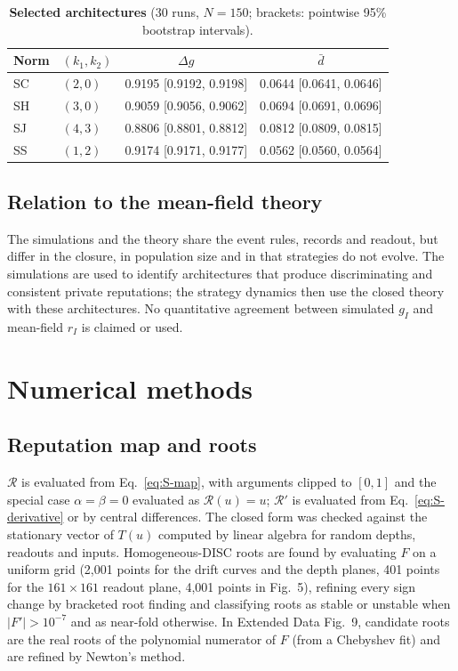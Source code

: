 \documentclass[fleqn,10pt]{article}
\theoremstyle{plain}
\theoremstyle{remark}
\newcommand{\FigOpportunism}{5}
\newcommand{\EDSecurity}{9}
\newcommand{\Rm}{\mathcal R}
\begin{document}
\begin{table}[htbp]
\centering\small
\caption{\textbf{Selected architectures} (30 runs, $N=150$; brackets: pointwise 95\% bootstrap intervals).}
\label{tab:selected}
\begin{tabular}{@{}llcc@{}}
\toprule
Norm & $(k_1,k_2)$ & $\Delta g$ & $\bar d$\\
\midrule
SC & $(2,0)$ & 0.9195 [0.9192, 0.9198] & 0.0644 [0.0641, 0.0646]\\
SH & $(3,0)$ & 0.9059 [0.9056, 0.9062] & 0.0694 [0.0691, 0.0696]\\
SJ & $(4,3)$ & 0.8806 [0.8801, 0.8812] & 0.0812 [0.0809, 0.0815]\\
SS & $(1,2)$ & 0.9174 [0.9171, 0.9177] & 0.0562 [0.0560, 0.0564]\\
\bottomrule
\end{tabular}
\end{table}

\subsection{Relation to the mean-field theory}
The simulations and the theory share the event rules, records and readout,
but differ in the closure, in population size and in that strategies do not
evolve. The simulations are used to identify architectures that produce
discriminating and consistent private reputations; the strategy dynamics
then use the closed theory with these architectures. No quantitative agreement
between simulated $g_I$ and mean-field $r_I$ is claimed or used.

\section{Numerical methods}
\label{sec:numerics}

\subsection{Reputation map and roots}
$\Rm$ is evaluated from Eq.~\eqref{eq:S-map}, with arguments clipped to $[0,1]$
and the special case $\alpha=\beta=0$ evaluated as $\Rm(u)=u$; $\Rm'$ is evaluated
from Eq.~\eqref{eq:S-derivative} or by central differences. The closed form was
checked against the stationary vector of $T(u)$ computed by linear algebra for
random depths, readouts and inputs. Homogeneous-DISC roots are found by
evaluating $F$ on a uniform grid (2,001 points for the drift curves and the
depth planes, 401 points for the $161\times161$ readout plane, 4,001 points in
Fig.~\FigOpportunism), refining every sign change by bracketed root finding and
classifying roots as stable or unstable when $|F'|>10^{-7}$ and as near-fold
otherwise. In Extended Data Fig.~\EDSecurity, candidate roots are the real roots
of the polynomial numerator of $F$ (from a Chebyshev fit) and are refined by
Newton's method.
\end{document}
